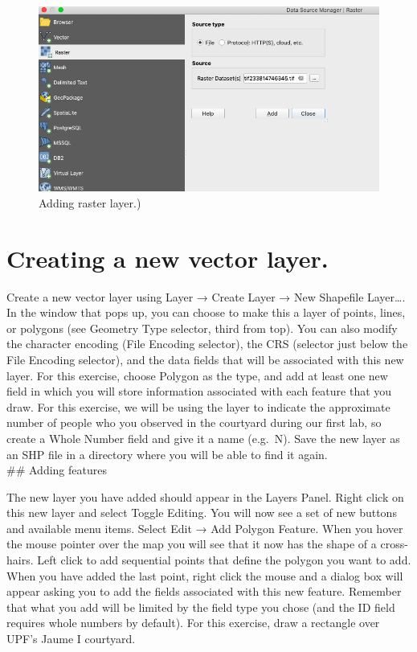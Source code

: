 \documentclass[]{book}
\begin{document}
\begin{figure}
\centering
\includegraphics{images/adding_raster_layer.png}
\caption{Adding raster layer.)}
\end{figure}

\hypertarget{creating-a-new-vector-layer.}{%
\section{Creating a new vector layer.}\label{creating-a-new-vector-layer.}}

Create a new vector layer using Layer → Create Layer → New Shapefile Layer\ldots{}. In the window that pops up, you can choose to make this a layer of points, lines, or polygons (see Geometry Type selector, third from top). You can also modify the character encoding (File Encoding selector), the CRS (selector just below the File Encoding selector), and the data fields that will be associated with this new layer.
For this exercise, choose Polygon as the type, and add at least one new field in which you will store information associated with each feature that you draw. For this exercise, we will be using the layer to indicate the approximate number of people who you observed in the courtyard during our first lab, so create a Whole Number field and give it a name (e.g.~N). Save the new layer as an SHP file in a directory where you will be able to find it again.\\
\#\# Adding features

The new layer you have added should appear in the Layers Panel. Right click on this new layer and select Toggle Editing. You will now see a set of new buttons and available menu items. Select Edit → Add Polygon Feature. When you hover the mouse pointer over the map you will see that it now has the shape of a cross-hairs. Left click to add sequential points that define the polygon you want to add. When you have added the last point, right click the mouse and a dialog box will appear asking you to add the fields associated with this new feature. Remember that what you add will be limited by the field type you chose (and the ID field requires whole numbers by default). For this exercise, draw a rectangle over UPF's Jaume I courtyard.
\end{document}
